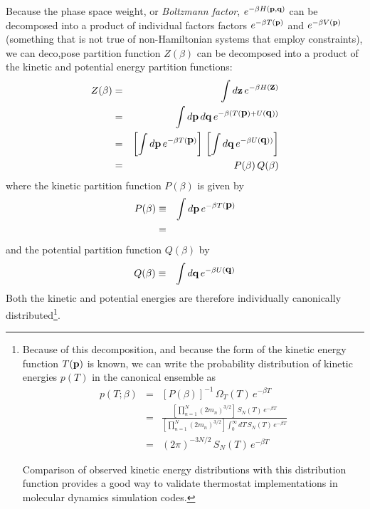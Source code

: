 Because the phase space weight, or \emph{Boltzmann factor}, $e^{-\beta H({\bf p},{\bf q})}$  can be decomposed into a product of individual factors factors $e^{-\beta T({\bf p})}$ and $e^{-\beta V({\bf p})}$ (something that is not true of non-Hamiltonian systems that employ constraints), we can deco,pose partition function $Z(\beta)$ can be decomposed into a product of the kinetic and potential energy partition functions:
\begin{eqnarray}
Z(\beta) &=& \int d{\bf z} \, e^{-\beta H({\mbox{\boldmath{${\bf z}$}}})} \nonumber \\
&=& \int d{\bf p} \, d{\bf q} \, e^{-\beta (T({\mbox{\boldmath{${\bf p}$}}}) + U({\mbox{\boldmath{${\bf q}$}}}))} \nonumber \\
&=& \left[ \int d{\bf p} \, e^{-\beta T({\mbox{\boldmath{${\bf p}$}}})} \right] \, \left[ \int d{\bf q} \, e^{-\beta U({\mbox{\boldmath{${\bf q}$}}}))} \right] \nonumber \\
&=& P(\beta) \, Q(\beta)
\end{eqnarray}
where the kinetic partition function $P(\beta)$ is given by
\begin{eqnarray}
P(\beta) &\equiv& \int d{\bf p} \, e^{-\beta T({\mbox{\boldmath{${\bf p}$}}})} \nonumber \\
&=& \label{equation:kinetic-energy-partition-function}
\end{eqnarray}
and the potential partition function $Q(\beta)$ by
\begin{eqnarray}
Q(\beta) &\equiv& \int d{\bf q} \, e^{-\beta U({\mbox{\boldmath{${\bf q}$}}})}
\end{eqnarray}
Both the kinetic and potential energies are therefore individually canonically distributed\footnote{Because of this decomposition, and because the form of the kinetic energy function $T({\bf p})$ is known, we can write the probability distribution of kinetic energies $p(T)$ in the canonical ensemble as
\begin{eqnarray}
p(T ; \beta) &=& [P(\beta)]^{-1} \, \Omega_T(T) \, e^{-\beta T} \\
&=& \frac{\left[ \prod_{n=1}^N (2 m_n)^{3/2} \right] \, S_N(T) \, e^{-\beta T}}{\left[ \prod_{n=1}^N (2 m_n)^{3/2} \right] \int_0^\infty dT\, S_N(T) \, e^{-\beta T}} \\
&=& (2 \pi)^{-3 N /2} \, S_N(T) \, e^{-\beta T}
\end{eqnarray}

Comparison of observed kinetic energy distributions with this distribution function provides a good way to validate thermostat implementations in molecular dynamics simulation codes.}.

